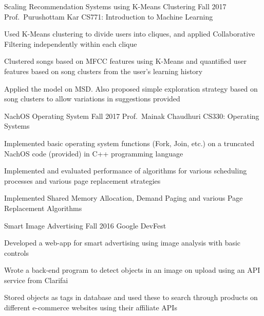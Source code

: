 \cventry
	{Scaling Recommendation Systems using K-Means Clustering}
	{Fall 2017}
	{Prof.\ Purushottam Kar}
	{CS771: Introduction to Machine Learning}
	{%
		\begin{cvitems}
            \item Used K-Means clustering to divide users into cliques, and applied Collaborative Filtering independently within each clique
            \item Clustered songs based on MFCC features using K-Means and quantified user features based on song clusters from the user’s learning history
            \item Applied the model on MSD. Also proposed simple exploration strategy based on song clusters to allow variations in suggestions provided
		\end{cvitems}
	}

\cventry
	{NachOS Operating System}
	{Fall 2017}
	{Prof.\ Mainak Chaudhuri}
	{CS330: Operating Systems}
	{%
		\begin{cvitems}
            \item Implemented basic operating system functions (Fork, Join, etc.) on a truncated NachOS code (provided) in C++ programming language
            \item Implemented and evaluated performance of algorithms for various scheduling processes and various page replacement strategies
            \item Implemented Shared Memory Allocation, Demand Paging and various Page Replacement Algorithms
		\end{cvitems}
	}

\cventry
	{Smart Image Advertising}
	{Fall 2016}
    {}
	{Google DevFest}
	{%
		\begin{cvitems}
            \item Developed a web-app for smart advertising using image analysis with basic controls
            \item Wrote a back-end program to detect objects in an image on upload using an API service from Clarifai
            \item Stored objects as tags in database and used these to search through products on different e-commerce websites using their affiliate APIs
		\end{cvitems}
	}

